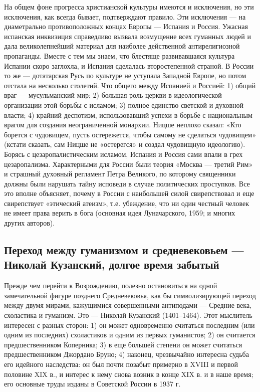 На общем  фоне прогресса  христианской культуры имеются  и исключения,
но  эти  исключения,  как  всегда бывает,  подтверждают  правило.  Эти
исключения  ---  на  диаметрально противоположных  концах  Европы  ---
Испания  и Россия.  Ужасная испанская  инквизиция справедливо  вызвала
возмущение  всех гуманных  людей и  дала великолепнейший  материал для
наиболее  действенной  антирелигиозной  пропаганды. Вместе  с  тем  мы
знаем,  что блестяще  развивавшаяся культура  Испании скоро  заглохла,
и  Испания  сделалась  второстепенной  страной. В  России  то  же  ---
дотатарская Русь  по культуре  не уступала  Западной Европе,  но потом
отстала на  несколько столетий. Что  общего между Испанией  и Россией:
1)  общий  враг  ---  мусульманский  мир; 2)  большая  роль  церкви  в
идеологической организации  этой борьбы с исламом;  3) полное единство
светской  и  духовной  власти; 4)  крайний  деспотизм,  использовавший
успехи  в борьбе  с  национальным врагом  для создания  неограниченной
монархии.  Ницше  неплохо  сказал:  «Кто борется  с  чудовищем,  пусть
остережется,  чтобы самому  не сделаться  чудовищем» (кстати  сказать,
сам  Ницше не  «остерегся» и  создал чудовищную  идеологию). Борясь  с
цезаропалистическим  исламом,  Испания  и  Россия сами  впали  в  грех
цезаропализма. Характерными для России  были теория «Москва --- третий
Рим»  и  страшный  духовный  регламент  Петра  Великого,  по  которому
священники должны  были нарушать тайну исповеди  в случае политических
проступков. Все  это вполне  объясняет, почему  в России  с наибольшей
силой  свирепствовал  и  еще  свирепствует  «этический  атеизм»,  т.е.
убеждение, что  ни один честный человек  не имеет права верить  в бога
(основная идея Луначарского, 1959; и многих других авторов).

\subsection{Переход  между  гуманизмом  и средневековьем  ---  Николай
Кузанский, долгое время забытый}

Прежде  чем  перейти  к  Возрождению, полезно  остановиться  на  одной
замечательной  фигуре позднего  Средневековья, как  бы символизирующей
переход  между двумя  мирами, кажущимися  совершенными антиподами  ---
Средние  века,  схоластика  и  гуманизм.  Это  ---  Николай  Кузанский
(1401--1464). Этот  мыслитель интересен с  разных сторон: 1)  он может
одновременно считаться последним (или  одним из последних) схоластиков
и  одним  из  первых  гуманистов;  2)  он  считается  предшественником
Коперника;   3)   в   еще   большей   степени   он   может   считаться
предшественником  Джордано Бруно;  4)  наконец, чрезвычайно  интересна
судьба его идейного наследства: он  был почти позабыт примерно в XVIII
и первой половине XIX в., и интерес к нему снова возник в конце XIX в.
и в наше время; его основные труды изданы в Советской России в 1937 г.

